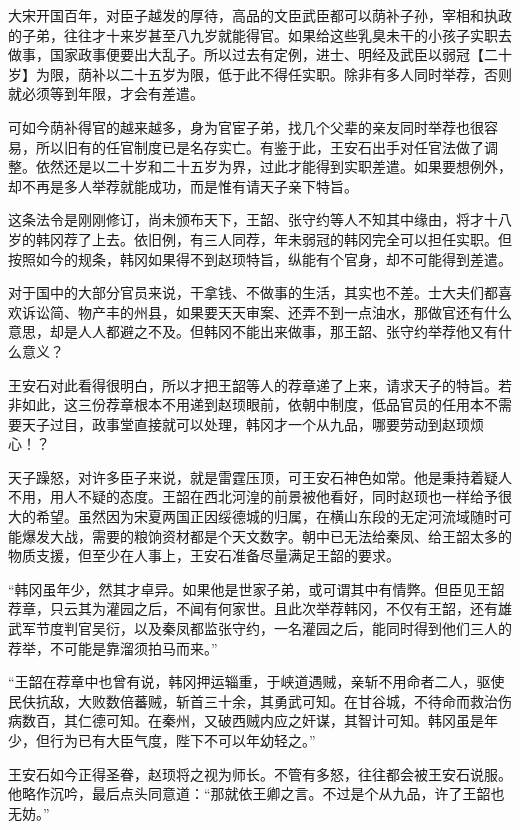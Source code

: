 大宋开国百年，对臣子越发的厚待，高品的文臣武臣都可以荫补子孙，宰相和执政的子弟，往往才十来岁甚至八九岁就能得官。如果给这些乳臭未干的小孩子实职去做事，国家政事便要出大乱子。所以过去有定例，进士、明经及武臣以弱冠【二十岁】为限，荫补以二十五岁为限，低于此不得任实职。除非有多人同时举荐，否则就必须等到年限，才会有差遣。

可如今荫补得官的越来越多，身为官宦子弟，找几个父辈的亲友同时举荐也很容易，所以旧有的任官制度已是名存实亡。有鉴于此，王安石出手对任官法做了调整。依然还是以二十岁和二十五岁为界，过此才能得到实职差遣。如果要想例外，却不再是多人举荐就能成功，而是惟有请天子亲下特旨。

这条法令是刚刚修订，尚未颁布天下，王韶、张守约等人不知其中缘由，将才十八岁的韩冈荐了上去。依旧例，有三人同荐，年未弱冠的韩冈完全可以担任实职。但按照如今的规条，韩冈如果得不到赵顼特旨，纵能有个官身，却不可能得到差遣。

对于国中的大部分官员来说，干拿钱、不做事的生活，其实也不差。士大夫们都喜欢诉讼简、物产丰的州县，如果要天天审案、还弄不到一点油水，那做官还有什么意思，却是人人都避之不及。但韩冈不能出来做事，那王韶、张守约举荐他又有什么意义？

王安石对此看得很明白，所以才把王韶等人的荐章递了上来，请求天子的特旨。若非如此，这三份荐章根本不用递到赵顼眼前，依朝中制度，低品官员的任用本不需要天子过目，政事堂直接就可以处理，韩冈才一个从九品，哪要劳动到赵顼烦心！？

天子躁怒，对许多臣子来说，就是雷霆压顶，可王安石神色如常。他是秉持着疑人不用，用人不疑的态度。王韶在西北河湟的前景被他看好，同时赵顼也一样给予很大的希望。虽然因为宋夏两国正因绥德城的归属，在横山东段的无定河流域随时可能爆发大战，需要的粮饷资材都是个天文数字。朝中已无法给秦凤、给王韶太多的物质支援，但至少在人事上，王安石准备尽量满足王韶的要求。

“韩冈虽年少，然其才卓异。如果他是世家子弟，或可谓其中有情弊。但臣见王韶荐章，只云其为灌园之后，不闻有何家世。且此次举荐韩冈，不仅有王韶，还有雄武军节度判官吴衍，以及秦凤都监张守约，一名灌园之后，能同时得到他们三人的荐举，不可能是靠溜须拍马而来。”

“王韶在荐章中也曾有说，韩冈押运辎重，于峡道遇贼，亲斩不用命者二人，驱使民伕抗敌，大败数倍蕃贼，斩首三十余，其勇武可知。在甘谷城，不待命而救治伤病数百，其仁德可知。在秦州，又破西贼内应之奸谋，其智计可知。韩冈虽是年少，但行为已有大臣气度，陛下不可以年幼轻之。”

王安石如今正得圣眷，赵顼将之视为师长。不管有多怒，往往都会被王安石说服。他略作沉吟，最后点头同意道：“那就依王卿之言。不过是个从九品，许了王韶也无妨。”

